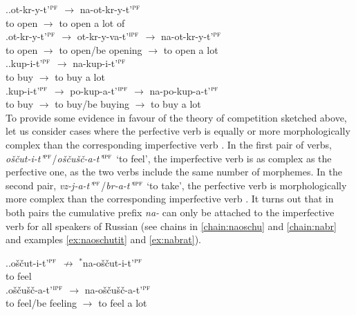\ex.\ag.\label{chain:naotkryt}ot-kr-y-t'$^{\textsc{pf}}$ $\rightarrow$ na-ot-kr-y-t'$^{\textsc{pf}}$\\
{to open} $\rightarrow$ {to open a lot of}\\
\bg.\label{chain:naotkryvat}ot-kr-y-t'$^{\textsc{pf}}$ $\rightarrow$ ot-kr-y-va-t'$^{\textsc{ipf}}$ $\rightarrow$ na-ot-kr-y-t'$^{\textsc{pf}}$\\
{to open} $\rightarrow$ {to open/be opening} $\rightarrow$ {to open a lot}\\

\ex.\ag.\label{chain:nakupit}kup-i-t'$^{\textsc{pf}}$ $\rightarrow$ na-kup-i-t'$^{\textsc{pf}}$\\
{to buy} $\rightarrow$ {to buy a lot}\\
\bg.\label{chain:napokupat}kup-i-t'$^{\textsc{pf}}$ $\rightarrow$ po-kup-a-t'$^{\textsc{ipf}}$ $\rightarrow$ na-po-kup-a-t'$^{\textsc{pf}}$\\
{to buy} $\rightarrow$ {to buy/be buying} $\rightarrow$ {to buy a lot}\\

To provide some evidence in favour of the theory of competition sketched above, let us consider cases where the perfective verb  is equally or more morphologically complex than the corresponding imperfective verb . In the first pair of verbs, \textit{o\v{s}\v{c}ut-i-t'}$^{\textsc{pf}}$\slash\textit{o\v{s}\v{c}u\v{s}\v{c}-a-t'}$^{\textsc{ipf}}$ `to feel', the imperfective verb  is as complex as the perfective one, as the two verbs include the same number of morphemes. In the second pair, \textit{vz-j-a-t'}$^{\textsc{pf}}$\slash\textit{br-a-t'}$^{\textsc{ipf}}$ `to take', the perfective verb  is morphologically more complex than the corresponding imperfective verb . It turns out that in both pairs the cumulative  prefix \textit{na-}   can only be attached to the imperfective verb  for all speakers of Russian (see chains in \ref{chain:naoschu} and \ref{chain:nabr} and examples \ref{ex:naoschutit} and \ref{ex:nabrat}). 

\ex.\label{chain:naoschu}\ag.o\v{s}\v{c}ut-i-t'$^{\textsc{pf}}$ $\nrightarrow$ $^*$na-o\v{s}\v{c}ut-i-t'$^{\textsc{pf}}$\label{chain:oschutit}\\
{to feel} {} {}\\
\bg.\label{chain:oschuschat}o\v{s}\v{c}u\v{s}\v{c}-a-t'$^{\textsc{ipf}}$ $\rightarrow$ na-o\v{s}\v{c}u\v{s}\v{c}-a-t'$^{\textsc{pf}}$\\
{to feel/be feeling} $\rightarrow$ {to feel a lot}\\

